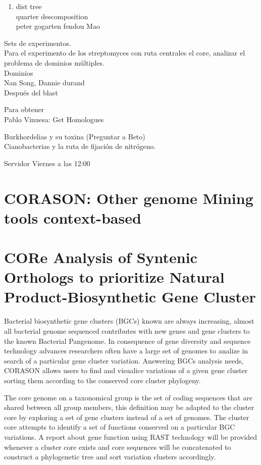\documentclass[12pt,twoside]{reedthesis}
\providecommand{\tightlist}{%
  \setlength{\itemsep}{0pt}\setlength{\parskip}{0pt}}
\begin{document}
  \begin{enumerate}
  \def\labelenumi{\arabic{enumi}.}
  \setcounter{enumi}{1}
  \tightlist
  \item
    dist tree\\
    quarter descomposition\\
    peter gogarten fendou Mao
  \end{enumerate}
  
  Sets de experimentos.\\
  Para el experimento de los streptomyces con ruta centrales el core,
  analizar el problema de dominios múltiples.\\
  Dominios\\
  Nan Song, Dannie durand\\
  Después del blast
  
  Para obtener\\
  Pablo Vinuesa: Get Homologues
  
  Burkhordelias y su toxina (Preguntar a Beto)\\
  Cianobacterias y la ruta de fijación de nitrógeno.
  
  Servidor Viernes a las 12:00
  
  \section{CORASON: Other genome Mining tools
  context-based}\label{corason-other-genome-mining-tools-context-based}
  
  \section{CORe Analysis of Syntenic Orthologs to prioritize Natural
  Product-Biosynthetic Gene
  Cluster}\label{core-analysis-of-syntenic-orthologs-to-prioritize-natural-product-biosynthetic-gene-cluster}
  
  Bacterial biosynthetic gene clusters (BGCs) known are always increasing,
  almost all bacterial genome sequenced contributes with new genes and
  gene clusters to the known Bacterial Pangenome. In consequence of gene
  diversity and sequence technology advances researchers often have a
  large set of genomes to analize in search of a particular gene cluster
  variation. Answering BGCs analysis needs, CORASON allows users to find
  and visualice variations of a given gene cluster sorting them according
  to the conserved core cluster phylogeny.
  
  The core genome on a taxonomical group is the set of coding sequences
  that are shared between all group members, this definition may be
  adapted to the cluster core by exploring a set of gene clusters instead
  of a set of genomes. The cluster core attempts to identify a set of
  functions conserved on a particular BGC variations. A report about gene
  function using RAST technology will be provided whenever a cluster core
  exists and core sequences will be concatenated to construct a
  phylogenetic tree and sort variation clusters accordingly.
  
\end{document}
